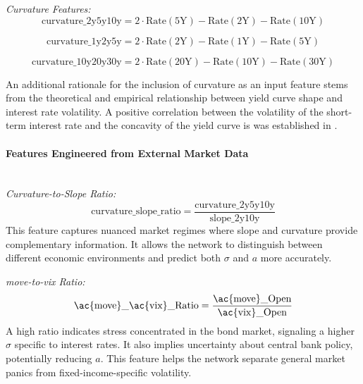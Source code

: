 \textit{Curvature Features:}
\begin{equation}
	\text{curvature\_2y5y10y} = 2 \cdot \text{Rate}(5\text{Y}) - \text{Rate}(2\text{Y}) - \text{Rate}(10\text{Y})
\end{equation}

\begin{equation}
	\text{curvature\_1y2y5y} = 2 \cdot \text{Rate}(2\text{Y}) - \text{Rate}(1\text{Y}) - \text{Rate}(5\text{Y})
\end{equation}

\begin{equation}
	\text{curvature\_10y20y30y} = 2 \cdot \text{Rate}(20\text{Y}) - \text{Rate}(10\text{Y}) - \text{Rate}(30\text{Y})
\end{equation}

An additional rationale for the inclusion of curvature as an input feature stems from the theoretical and empirical relationship between yield curve shape and interest rate volatility. A positive correlation between the volatility of the short-term interest rate and the concavity of the yield curve is was established in \textcite{christiansen2005revisityieldcurve}.

\paragraph{Features Engineered from External Market Data} \mbox{}\\
\textit{Curvature-to-Slope Ratio:}
\begin{equation}
	\text{curvature\_slope\_ratio} = \frac{\text{curvature\_2y5y10y}}{\text{slope\_2y10y}}
\end{equation}
This feature captures nuanced market regimes where slope and curvature provide complementary information. It allows the network to distinguish between different economic environments and predict both \(\sigma\) and \(a\) more accurately.

\textit{\ac{move}-to-\ac{vix} Ratio:}
\begin{equation}
	\text{\ac{move}\_\ac{vix}\_Ratio} = \frac{\text{\ac{move}\_Open}}{\text{\ac{vix}\_Open}}
\end{equation}
A high ratio indicates stress concentrated in the bond market, signaling a higher \(\sigma\) specific to interest rates. It also implies uncertainty about central bank policy, potentially reducing \(a\). This feature helps the network separate general market panics from fixed-income-specific volatility.

